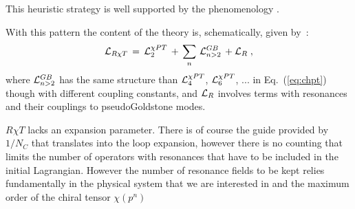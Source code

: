 \documentclass{appolb}
\begin{document}
This heuristic strategy is well supported by the
phenomenology \cite{Peris:1998nj,Cirigliano:2006hb,Knecht:2001xc,Cirigliano:2004ue,Cirigliano:2005xn}.
\vspace*{0.2cm}
\par
With this pattern the content of the theory is, schematically, given by~:
\begin{equation}
{\cal L}_{R \chi T} \, = \, {\cal L}_2^{\chi PT} \, + \, \sum_n \, {\cal L}_{n>2}^{GB} \, + {\cal L}_R \; , 
\end{equation}
where ${\cal L}_{n>2}^{GB}$ has the same structure than ${\cal L}_4^{\chi PT}$, ${\cal L}_6^{\chi PT}$, ...
in Eq.~(\ref{eq:chpt})
though with different coupling constants, and ${\cal L}_R$ involves terms with resonances and their couplings
to pseudoGoldstone modes. 
\par
$R \chi T$ lacks an expansion parameter. There is of course the guide provided by $1/N_C$ that translates into the
loop expansion, however there is no counting that limits the number of operators with resonances that have to be 
included in the initial Lagrangian. However the number of resonance fields to be kept relies fundamentally in the physical 
system that we are interested in and the maximum order of the chiral tensor $\chi (p^n)$ 
\end{document}
